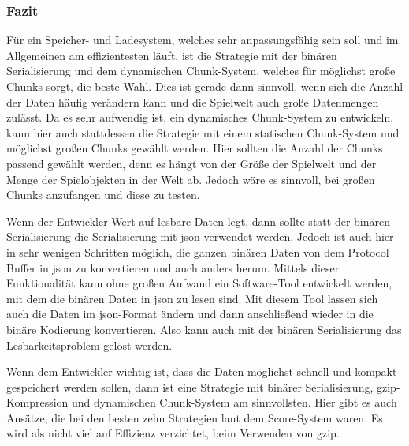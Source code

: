 \subsubsection{Fazit}
Für ein Speicher- und Ladesystem, welches sehr anpassungsfähig sein soll und im Allgemeinen am effizientesten läuft, ist die Strategie mit der binären Serialisierung und dem dynamischen Chunk-System, welches für möglichst große Chunks sorgt, die beste Wahl. Dies ist gerade dann sinnvoll, wenn sich die Anzahl der Daten häufig verändern kann und die Spielwelt auch große Datenmengen zulässt. Da es sehr aufwendig ist, ein dynamisches Chunk-System zu entwickeln, kann hier auch stattdessen die Strategie mit einem statischen Chunk-System und möglichst großen Chunks gewählt werden. Hier sollten die Anzahl der Chunks passend gewählt werden, denn es hängt von der Größe der Spielwelt und der Menge der Spielobjekten in der Welt ab. Jedoch wäre es sinnvoll, bei großen Chunks anzufangen und diese zu testen.    

Wenn der Entwickler Wert auf lesbare Daten legt, dann sollte statt der binären Serialisierung die Serialisierung mit \ac{json} verwendet werden. Jedoch ist auch hier in sehr wenigen Schritten möglich, die ganzen binären Daten von dem Protocol Buffer in \ac{json} zu konvertieren und auch anders herum.\cite{baeldungProtobufToJson} Mittels dieser Funktionalität kann ohne großen Aufwand ein Software-Tool entwickelt werden, mit dem die binären Daten in \ac{json} zu lesen sind. Mit diesem Tool lassen sich auch die Daten im \ac{json}-Format ändern und dann anschließend wieder in die binäre Kodierung konvertieren. Also kann auch mit der binären Serialisierung das  Lesbarkeitsproblem gelöst werden.

Wenn dem Entwickler wichtig ist, dass die Daten möglichst schnell und kompakt gespeichert werden sollen, dann ist eine Strategie mit binärer Serialisierung, \ac{gzip}-Kompression und dynamischen Chunk-System am sinnvollsten. Hier gibt es auch Ansätze, die bei den besten zehn Strategien laut dem Score-System waren. Es wird als nicht viel auf Effizienz verzichtet, beim Verwenden von \ac{gzip}.